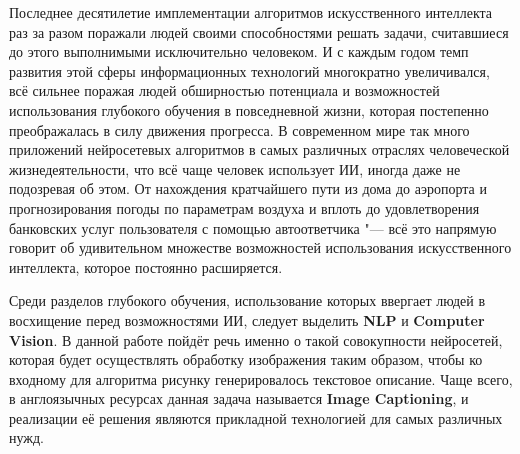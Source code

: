 \documentclass[bachelor, och, coursework]{SCWorks}
\begin{document}


\tableofcontents

\intro

    Последнее десятилетие имплементации алгоритмов искусственного интеллекта раз за разом поражали людей своими
    способностями решать задачи, считавшиеся до этого выполнимыми исключительно человеком. И с каждым годом темп
    развития этой сферы информационных технологий многократно увеличивался, всё сильнее поражая людей обширностью
    потенциала и возможностей использования глубокого обучения в повседневной жизни, которая постепенно преображалась в
    силу движения прогресса. В современном мире так много приложений нейросетевых алгоритмов в самых различных отраслях
    человеческой жизнедеятельности, что всё чаще человек использует ИИ, иногда даже не подозревая об этом. От нахождения
    кратчайшего пути из дома до аэропорта и прогнозирования погоды по параметрам воздуха и вплоть до удовлетворения
    банковских услуг пользователя с помощью автоответчика "--- всё это напрямую говорит об удивительном множестве
    возможностей использования искусственного интеллекта, которое постоянно расширяется.
    
    Среди разделов глубокого обучения, использование которых ввергает людей в восхищение перед возможностями ИИ, следует
    выделить \textbf{NLP} и \textbf{Computer Vision}. В данной работе пойдёт речь именно о такой совокупности
    нейросетей, которая будет осуществлять обработку изображения таким образом, чтобы ко входному для алгоритма рисунку
    генерировалось текстовое описание. Чаще всего, в англоязычных ресурсах данная задача называется \textbf{Image
    Captioning}, и реализации её решения являются прикладной технологией для самых различных нужд.

\end{document}
